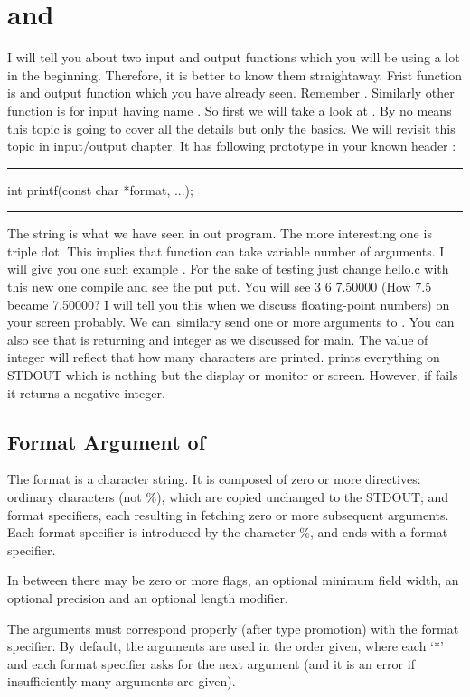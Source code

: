 \section{ and }
I will tell you about two input and output functions which you will be using a
lot in the beginning. Therefore, it is better to know them straightaway. Frist
function is and output function which you have already seen. Remember
. Similarly other function is for input having name .
So first we will take a look at . By no means this topic is going
to cover all the details but only the basics. We will revisit this topic in
input/output chapter. It has following prototype in
your known header :
{
\blank[force,1mm]\hrule\blank[force,1mm]
\startCPP
int printf(const char *format, ...);
\stopCPP
\hrule
}
The string  is what we have seen in out program. The
more interesting one is triple dot. This implies that function can take variable number
of arguments. I will give you one such example . For the sake of testing just change hello.c with this new one compile
and see the put put. You will see 3 6 7.50000 (How 7.5 became 7.50000? I will
tell you this when we discuss floating-point numbers) on your screen probably.
We can\ similary send one or more arguments to . You can also see
that  is returning and integer as we discussed for main. The value
of integer will reflect that how many characters are printed. 
prints everything on STDOUT which is nothing but the display or monitor or screen.
However, if  fails it returns a negative integer.
\subsection{Format Argument of }
The format is a character string.  It is composed of zero  or  more directives: 
ordinary characters (not \%), which are copied unchanged to the STDOUT; and 
format specifiers, each resulting in fetching zero or more subsequent arguments. 
Each format specifier is introduced by the character \%, and ends with a format
specifier.

In between  there  may be zero or more flags, an optional minimum field width,
an optional precision and an optional length modifier.

The arguments must correspond properly (after type promotion) with the format
specifier. By default, the arguments are used  in the order given, where
each  `*' and each format specifier asks for the next argument (and it is an
error if insufficiently many arguments are given).

